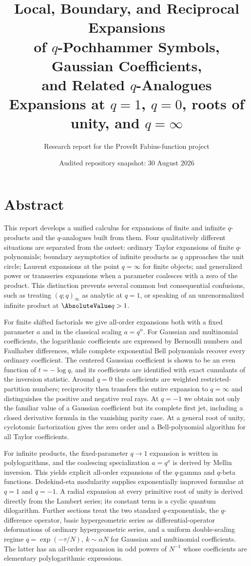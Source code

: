 \documentclass[11pt,oneside]{article}
\title{\textbf{Local, Boundary, and Reciprocal Expansions\\of $q$-Pochhammer Symbols, Gaussian Coefficients,\\and Related $q$-Analogues}\\[0.8em]
\large Expansions at $q=1$, $q=0$, roots of unity, and $q=\infty$}
\author{Research report for the ProveIt Fabius-function project}
\date{Audited repository snapshot: 30 August 2026}
\theoremstyle{definition}
\theoremstyle{remark}
\let\reporttopsection\section
\let\reportsubsection\subsection
\let\chapter\reporttopsection
\let\section\reportsubsection
\providecommand{\frontmatter}{}
\begin{document}
\hypersetup{pageanchor=false}
\maketitle
\hypersetup{pageanchor=true}
\frontmatter

\chapter*{Abstract}
This report develops a unified calculus for expansions of finite and infinite
$q$-products and the $q$-analogues built from them.  Four qualitatively different
situations are separated from the outset: ordinary Taylor expansions of finite
$q$-polynomials; boundary asymptotics of infinite products as $q$ approaches the
unit circle; Laurent expansions at the point $q=\infty$ for finite objects; and
generalized power or transseries expansions when a parameter coalesces with a
zero of the product.  This distinction prevents several common but consequential
confusions, such as treating $(q;q)_\infty$ as analytic at $q=1$, or speaking of
an unrenormalized infinite product at $\AbsoluteValue q>1$.

For finite shifted factorials we give all-order expansions both with a fixed
parameter $a$ and in the classical scaling $a=q^\alpha$.  For Gaussian and
multinomial coefficients, the logarithmic coefficients are expressed by
Bernoulli numbers and Faulhaber differences, while complete exponential Bell
polynomials recover every ordinary coefficient.  The centered Gaussian
coefficient is shown to be an even function of $t=-\log q$, and its coefficients
are identified with exact cumulants of the inversion statistic.  Around $q=0$
the coefficients are weighted restricted-partition numbers; reciprocity then
transfers the entire expansion to $q=\infty$ and distinguishes the positive and
negative real rays.  At $q=-1$ we obtain not only the familiar value of a
Gaussian coefficient but its complete first jet, including a closed derivative
formula in the vanishing parity case.  At a general root of unity, cyclotomic
factorization gives the zero order and a Bell-polynomial algorithm for all
Taylor coefficients.

For infinite products, the fixed-parameter $q\to1$ expansion is written in
polylogarithms, and the coalescing specialization $a=q^x$ is derived by Mellin
inversion.  This yields explicit all-order expansions of the $q$-gamma and
$q$-beta functions.  Dedekind-eta modularity supplies exponentially improved
formulae at $q=1$ and $q=-1$.  A radial expansion at every primitive root of
unity is derived directly from the Lambert series; its constant term is a
cyclic quantum dilogarithm.  Further sections treat the two standard
$q$-exponentials, the $q$-difference operator, basic hypergeometric series as
differential-operator deformations of ordinary hypergeometric series, and a
uniform double-scaling regime
\(
q=\exp(-\tau/N),\ k\sim\alpha N
\)
for Gaussian and multinomial coefficients.  The latter has an all-order
expansion in odd powers of $N^{-1}$ whose coefficients are elementary
polylogarithmic expressions.
\end{document}
